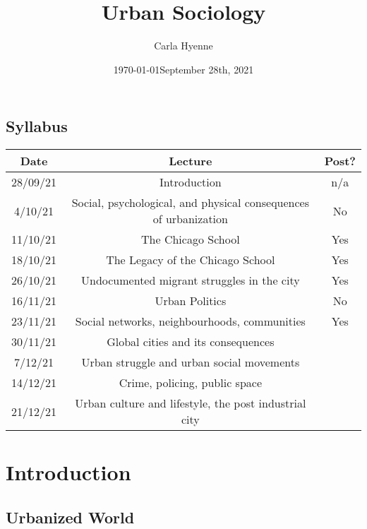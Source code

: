 \documentclass{article}
\title{Urban Sociology}
\author{Carla Hyenne }
\date{\today}
\begin{document}
\maketitle

\tableofcontents

\subsection{Syllabus}

\begin{tabular}{|c|c|c|}
	\hline
	Date & Lecture & Post? \\ 
	 \hline
	28/09/21 & Introduction & n/a  \\  
	 \hline
	4/10/21 & Social, psychological, and physical consequences of urbanization & No \\   
	 \hline
	 11/10/21 & The Chicago School & Yes \\
	 \hline
	 18/10/21 & The Legacy of the Chicago School & Yes \\   
	 \hline
	 26/10/21 & Undocumented migrant struggles in the city & Yes  \\   
	  \hline
	 16/11/21 & Urban Politics &  No \\   
	 \hline
	 23/11/21 & Social networks, neighbourhoods, communities & Yes  \\   
	 \hline
	 30/11/21 & Global cities and its consequences &  \\   
	  \hline
	 7/12/21 & Urban struggle and urban social movements &  \\   
	 \hline
	 14/12/21 & Crime, policing, public space &  \\   
	 \hline
	 21/12/21 & Urban culture and lifestyle, the post industrial city &  \\   
	
	
	 \hline
\end{tabular}

\pagebreak


\section{Introduction}
\date{September 28th, 2021}

\subsection{Urbanized World}
\end{document}
